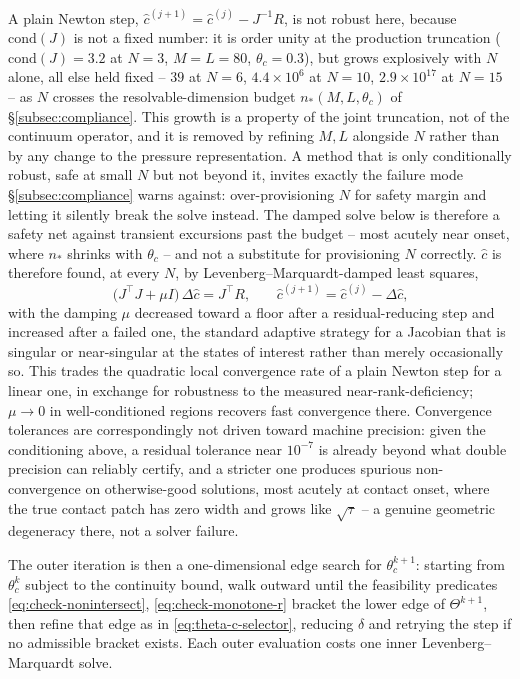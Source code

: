 A plain Newton step, $\hat c^{(j+1)}=\hat c^{(j)}-J^{-1}R$, is not robust here, because $\mathrm{cond}(J)$ is not a fixed number: it is order unity at the production truncation ($\mathrm{cond}(J)=3.2$ at $N=3$, $M=L=80$, $\theta_c=0.3$), but grows explosively with $N$ alone, all else held fixed -- $39$ at $N=6$, $4.4\times10^6$ at $N=10$, $2.9\times10^{17}$ at $N=15$ -- as $N$ crosses the resolvable-dimension budget $n_\ast(M,L,\theta_c)$ of \S\ref{subsec:compliance}. This growth is a property of the joint truncation, not of the continuum operator, and it is removed by refining $M,L$ alongside $N$ rather than by any change to the pressure representation. A method that is only conditionally robust, safe at small $N$ but not beyond it, invites exactly the failure mode \S\ref{subsec:compliance} warns against: over-provisioning $N$ for safety margin and letting it silently break the solve instead. The damped solve below is therefore a safety net against transient excursions past the budget -- most acutely near onset, where $n_\ast$ shrinks with $\theta_c$ -- and not a substitute for provisioning $N$ correctly. $\hat c$ is therefore found, at every $N$, by Levenberg--Marquardt-damped least squares,
\begin{equation}
    \big(J^\top J+\mu I\big)\,\Delta\hat c = J^\top R\text{,}\qquad \hat c^{(j+1)}=\hat c^{(j)}-\Delta\hat c\text{,}
    \label{eq:newton-step}
\end{equation}
with the damping $\mu$ decreased toward a floor after a residual-reducing step and increased after a failed one, the standard adaptive strategy for a Jacobian that is singular or near-singular at the states of interest rather than merely occasionally so. This trades the quadratic local convergence rate of a plain Newton step for a linear one, in exchange for robustness to the measured near-rank-deficiency; $\mu\to0$ in well-conditioned regions recovers fast convergence there. Convergence tolerances are correspondingly not driven toward machine precision: given the conditioning above, a residual tolerance near $10^{-7}$ is already beyond what double precision can reliably certify, and a stricter one produces spurious non-convergence on otherwise-good solutions, most acutely at contact onset, where the true contact patch has zero width and grows like $\sqrt\tau$ -- a genuine geometric degeneracy there, not a solver failure.

The outer iteration is then a one-dimensional edge search for $\theta_c^{k+1}$: starting from $\theta_c^k$ subject to the continuity bound, walk outward until the feasibility predicates \eqref{eq:check-nonintersect}, \eqref{eq:check-monotone-r} bracket the lower edge of $\Theta^{k+1}$, then refine that edge as in \eqref{eq:theta-c-selector}, reducing $\delta$ and retrying the step if no admissible bracket exists. Each outer evaluation costs one inner Levenberg--Marquardt solve.

